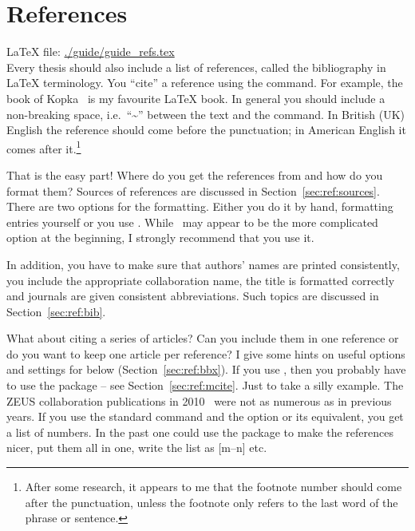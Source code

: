 \chapter{References}
\label{sec:ref}

\LaTeX{} file: \url{./guide/guide_refs.tex}\\[1ex]
\noindent
Every thesis should also include a list of references, called the
bibliography in \LaTeX{} terminology. You \enquote{cite} a reference using
the  command. For example, the book of
Kopka~\cite{kopka04} is my favourite \LaTeX{} book. In general you
should include a non-breaking space, i.e.\ \enquote{\textasciitilde} between
the text and the  command. In British (UK) English the reference
should come before the punctuation; in American English it comes after
it.\footnote{After some research, it appears to me that the footnote
  number should come after the punctuation, unless the footnote only
  refers to the last word of the phrase or sentence.}

That is the easy part!  Where do you get the references from and how
do you format them? Sources of references are discussed in
Section~\ref{sec:ref:sources}.
There are two options for the formatting. Either you do it by
hand, formatting  entries yourself or you use
\BibTeX. While \BibTeX\ may appear to be the more complicated option
at the beginning, I strongly recommend that you use it.

In addition, you have to make sure that authors' names are
printed consistently, you include the appropriate collaboration
name, the title is formatted correctly and journals are given
consistent abbreviations. Such topics are discussed in
Section~\ref{sec:ref:bib}.

What about citing a series of articles? Can you
include them in one reference or do you want to keep one article per
reference?
I give some hints on
useful options and settings for  below (Section~\ref{sec:ref:bbx}).
If you use \BibTeX, then you probably have to use the 
package -- see Section~\ref{sec:ref:mcite}.
Just to take a silly example. The ZEUS collaboration
publications in
2010~\cite{Abramowicz:2010ih,Abramowicz:2010xc,Abramowicz:2010nj} were
not as numerous as in previous years. If you use the standard
 command and the  option or its equivalent,
you get a list of numbers.  In the past one could use the
 package to make the references nicer, put them all in
one, write the list as [m--n] etc.



